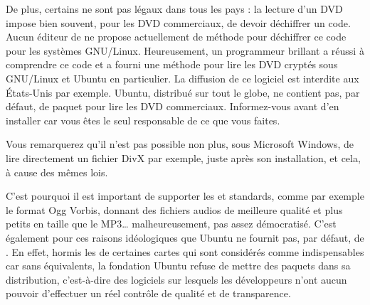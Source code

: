 De plus, certains  ne sont pas légaux dans tous les pays : la lecture d'un DVD impose bien souvent, pour les DVD commerciaux, de devoir déchiffrer un code.  Aucun éditeur de  ne propose actuellement de méthode pour déchiffrer ce code pour les systèmes GNU/Linux. Heureusement, un programmeur brillant a réussi à comprendre ce code et a fourni une méthode pour lire les DVD cryptés sous GNU/Linux et Ubuntu en particulier. La diffusion de ce logiciel est interdite aux États-Unis par exemple. Ubuntu, distribué sur tout le globe, ne contient pas, par défaut, de paquet pour lire les DVD commerciaux. Informez-vous avant d'en installer car vous êtes le seul responsable de ce que vous faites.\par
\begin{nota}
Vous remarquerez qu'il n'est pas possible non plus, sous Microsoft Windows, de lire directement un fichier DivX par exemple, juste après son installation, et cela, à cause des mêmes lois.
\end{nota}
C'est pourquoi il est important de supporter les   et standards, comme par exemple le format Ogg Vorbis, donnant des fichiers audios de meilleure qualité et plus petits en taille que le MP3\ldots{} malheureusement, pas assez démocratisé. C'est également pour ces raisons idéologiques que Ubuntu ne fournit pas, par défaut, de  . En effet, hormis les   de certaines cartes  qui sont considérés comme indispensables car sans équivalents, la fondation Ubuntu refuse de mettre des paquets  dans sa distribution, c'est-à-dire des logiciels sur lesquels les développeurs n'ont aucun pouvoir d'effectuer un réel contrôle de qualité et de transparence.
